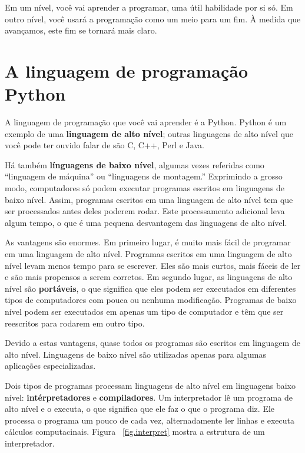 \documentclass[10pt]{book}
\begin{document}
Em um nível, você vai aprender a programar, uma útil
habilidade por si só. Em outro nível, você usará a programação como um meio para
um fim. À medida que avançamos, este fim se tornará mais claro.

\section{A linguagem de programação Python}

A linguagem de programação que você vai aprender é a Python. Python é
um exemplo de uma {\bf linguagem de alto nível}; outras linguagens de alto nível
que você pode ter ouvido falar de são C, C++, Perl e Java.

Há
também {\bf línguagens de baixo nível}, algumas vezes referidas como ``linguagem de
máquina'' ou ``linguagens de montagem.'' Exprimindo a grosso modo, computadores
só podem executar programas escritos em linguagens de baixo nível. Assim,
programas escritos em uma linguagem de alto nível tem que ser processados ​​antes
deles poderem rodar. Este processamento adicional leva algum tempo, o que é uma pequena
desvantagem das linguagens de alto nível.

As vantagens são enormes. Em primeiro lugar, é muito mais fácil de programar
em uma linguagem de alto nível. Programas escritos em uma linguagem de alto nível
levam menos tempo para se escrever. Eles são mais curtos, mais fáceis de ler e
são mais propensos a serem corretos. Em segundo lugar, as linguagens de alto nível são {\bf
portáveis}, o que significa que eles podem ser executados em diferentes tipos de computadores
com pouca ou nenhuma modificação. Programas de baixo nível podem ser executados em apenas um
tipo de computador e têm que ser reescritos para rodarem em outro tipo.

Devido a estas vantagens, quase todos os programas são escritos em linguagem de alto
nível. Linguagens de baixo nível são utilizadas apenas para algumas aplicações
especializadas.

Dois tipos de programas processam linguagens de alto nível em linguagens baixo
nível: {\bf intérpretadores} e {\bf compiladores}. Um interpretador
lê um programa de alto nível e o executa, o que significa que ele faz o que
o programa diz. Ele processa o programa um pouco de cada vez,
alternadamente ler linhas e executa cálculos computacinais.
Figura~ \ref{fig.interpret} mostra a estrutura de um interpretador.
\end{document}
